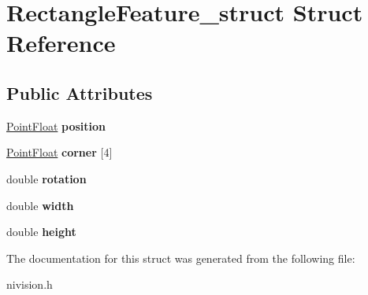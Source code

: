 \hypertarget{structRectangleFeature__struct}{\section{\-Rectangle\-Feature\-\_\-struct \-Struct \-Reference}
\label{structRectangleFeature__struct}
}
\subsection*{\-Public \-Attributes}
\begin{DoxyCompactItemize}
\item 
\hypertarget{structRectangleFeature__struct_aaf7a612cba18d3a08d5479596c95f1b9}{\hyperlink{structPointFloat__struct}{\-Point\-Float} {\bfseries position}}\label{structRectangleFeature__struct_aaf7a612cba18d3a08d5479596c95f1b9}

\item 
\hypertarget{structRectangleFeature__struct_adbde3a8265db2632c14dd5644b13973f}{\hyperlink{structPointFloat__struct}{\-Point\-Float} {\bfseries corner} \mbox{[}4\mbox{]}}\label{structRectangleFeature__struct_adbde3a8265db2632c14dd5644b13973f}

\item 
\hypertarget{structRectangleFeature__struct_af49b58aab4d972f394d2b6f8fbc95d70}{double {\bfseries rotation}}\label{structRectangleFeature__struct_af49b58aab4d972f394d2b6f8fbc95d70}

\item 
\hypertarget{structRectangleFeature__struct_ad6f9ffb1e271b08fc3ecf31cde63aebb}{double {\bfseries width}}\label{structRectangleFeature__struct_ad6f9ffb1e271b08fc3ecf31cde63aebb}

\item 
\hypertarget{structRectangleFeature__struct_aac1ca7f5d51454be3d14f7af1fb7a4a8}{double {\bfseries height}}\label{structRectangleFeature__struct_aac1ca7f5d51454be3d14f7af1fb7a4a8}

\end{DoxyCompactItemize}


\-The documentation for this struct was generated from the following file\-:\begin{DoxyCompactItemize}
\item 
nivision.\-h\end{DoxyCompactItemize}
